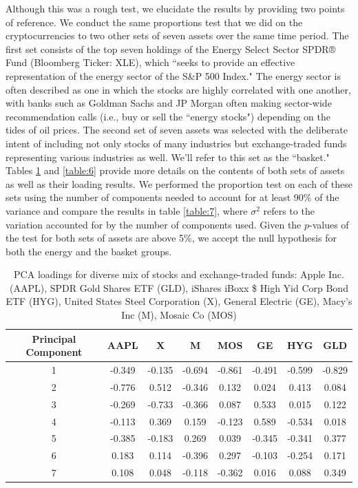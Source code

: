 \documentclass[12pt,twoside]{article}
\newcommand{\head}[1]{\textnormal{\textbf{#1}}}
\begin{document}
\bigbreak
Although this was a rough test, we elucidate the results by providing two points of reference. We conduct the same proportions test that we did on the cryptocurrencies to two other sets of seven assets over the same time period. The first set consists of the top seven holdings of the Energy Select Sector SPDR® Fund (Bloomberg Ticker: XLE), which ``seeks to provide an effective representation of the energy sector of the S\&P 500 Index." The energy sector is often described as one in which the stocks are highly correlated with one another, with banks such as Goldman Sachs and JP Morgan often making sector-wide recommendation calls (i.e., buy or sell the ``energy stocks") depending on the tides of oil prices. The second set of seven assets was selected with the deliberate intent of including not only stocks of many industries but exchange-traded funds representing various industries as well. We'll refer to this set as the ``basket." Tables \ref{table:loadings_bsk} and \ref{table:6} provide more details on the contents of both sets of assets as well as their loading results. We performed the proportion test on each of these sets using the number of components needed to account for at least 90\% of the variance and compare the results in table \ref{table:7}, where $\sigma^2$ refers to the variation accounted for by the number of components used. Given the $p$-values of the test for both sets of assets are above 5\%, we accept the null hypothesis for both the energy and the basket groups.

\begin{table}[h!]
	\centering
	\begin{tabular}{cccccccc}
		\toprule
		\head{Principal Component} & \head{AAPL} & \head{X} & \head{M} &      \head{MOS} & \head{GE} & \head{HYG} & \head{GLD} \\
		\midrule
		1         & -0.349 & -0.135 & -0.694 & -0.861 & -0.491 & -0.599 & -0.829 \\
		2         & -0.776 &  0.512 & -0.346 &  0.132 &  0.024 &  0.413 &  0.084 \\
		3         & -0.269 & -0.733 & -0.366 &  0.087 &  0.533 &  0.015 &  0.122 \\
		4         & -0.113 &  0.369 &  0.159 & -0.123 &  0.589 & -0.534 &  0.018 \\
		5         & -0.385 & -0.183 &  0.269 &  0.039 & -0.345 & -0.341 &  0.377 \\
		6         &  0.183 &  0.114 & -0.396 &  0.297 & -0.103 & -0.254 &  0.171 \\
		7         &  0.108 &  0.048 & -0.118 & -0.362 &  0.016 &  0.088 &  0.349 \\
		\bottomrule
	\end{tabular}
	\caption{PCA loadings for diverse mix of stocks and exchange-traded funds: Apple Inc. (AAPL), SPDR Gold Shares ETF (GLD),  iShares iBoxx \$ High Yid Corp Bond ETF (HYG), United States Steel Corporation (X), General Electric (GE), Macy's Inc (M), Mosaic Co (MOS) }
	\label{table:loadings_bsk}
\end{table}
\end{document}
